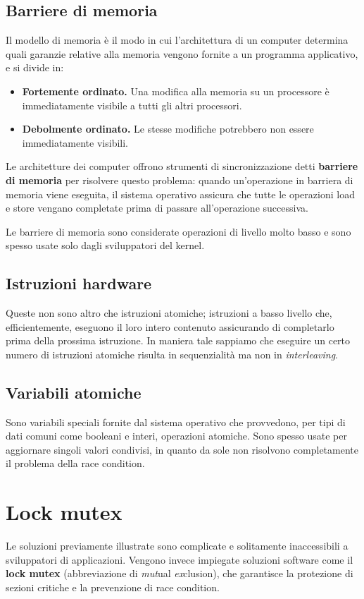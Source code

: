    \subsection{Barriere di memoria}
        Il modello di memoria è il modo in cui l'architettura di un computer determina quali garanzie relative alla memoria vengono fornite a un programma applicativo, e si divide in:
        \begin{itemize}
            \item \textbf{Fortemente ordinato.} Una modifica alla memoria su un processore è immediatamente visibile a tutti gli altri processori.
            \item \textbf{Debolmente ordinato.} Le stesse modifiche potrebbero non essere immediatamente visibili.
        \end{itemize}
        
        Le architetture dei computer offrono strumenti di sincronizzazione detti \textbf{barriere di memoria} per risolvere questo problema: quando un'operazione in barriera di memoria viene eseguita, il sistema operativo assicura che tutte le operazioni load e store vengano completate prima di passare all'operazione successiva.
        
        Le barriere di memoria sono considerate operazioni di livello molto basso e sono spesso usate solo dagli sviluppatori del kernel.
        
    \subsection{Istruzioni hardware}
        Queste non sono altro che istruzioni atomiche; istruzioni a basso livello che, efficientemente, eseguono il loro intero contenuto assicurando di completarlo prima della prossima istruzione. In maniera tale sappiamo che eseguire un certo numero di istruzioni atomiche risulta in sequenzialità ma non in \textit{interleaving}.
        
    \subsection{Variabili atomiche}
        Sono variabili speciali fornite dal sistema operativo che provvedono, per tipi di dati comuni come booleani e interi, operazioni atomiche. Sono spesso usate per aggiornare singoli valori condivisi, in quanto da sole non risolvono completamente il problema della race condition.
        
\section{Lock mutex}
    Le soluzioni previamente illustrate sono complicate e solitamente inaccessibili a sviluppatori di applicazioni. Vengono invece impiegate soluzioni software come il \textbf{lock mutex} (abbreviazione di \textit{mut}ual \textit{ex}clusion), che garantisce la protezione di sezioni critiche e la prevenzione di race condition.
    
